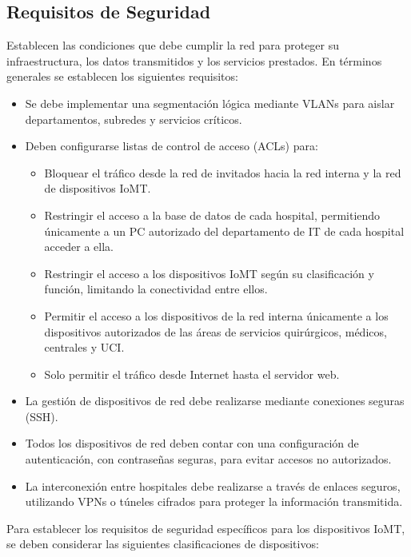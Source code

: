 \subsection{Requisitos de Seguridad}
\label{subsec: TiposIoMT}
Establecen las condiciones que debe cumplir la red para proteger su infraestructura, los datos transmitidos y los servicios prestados. En términos generales se establecen los siguientes requisitos:
\begin{itemize}
    \item Se debe implementar una segmentación lógica mediante VLANs para aislar departamentos, subredes y servicios críticos.
    \item Deben configurarse listas de control de acceso (ACLs) para:
    \begin{itemize}
        \item Bloquear el tráfico desde la red de invitados hacia la red interna y la red de dispositivos IoMT.
        \item Restringir el acceso a la base de datos de cada hospital, permitiendo únicamente a un PC autorizado del departamento de IT de cada hospital acceder a ella.
        \item Restringir el acceso a los dispositivos IoMT según su clasificación y función, limitando la conectividad entre ellos.
        \item Permitir el acceso a los dispositivos de la red interna únicamente a los dispositivos autorizados de las áreas de servicios quirúrgicos, médicos, centrales y \ac{UCI}.
        \item Solo permitir el tráfico desde Internet hasta el servidor web.
    \end{itemize}
    \item La gestión de dispositivos de red debe realizarse mediante conexiones seguras (SSH).
    \item Todos los dispositivos de red deben contar con una configuración de autenticación, con contraseñas seguras, para evitar accesos no autorizados.
    \item La interconexión entre hospitales debe realizarse a través de enlaces seguros, utilizando VPNs o túneles cifrados para proteger la información transmitida.
\end{itemize}
Para establecer los requisitos de seguridad específicos para los dispositivos IoMT, se deben considerar las siguientes clasificaciones de dispositivos:
